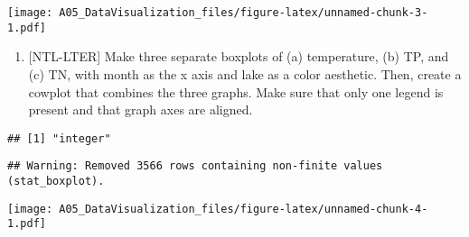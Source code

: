 \documentclass[]{article}
\newenvironment{Shaded}{\begin{snugshade}}{\end{snugshade}}
\newcommand{\DataTypeTok}[1]{\textcolor[rgb]{0.13,0.29,0.53}{#1}}
\newcommand{\KeywordTok}[1]{\textcolor[rgb]{0.13,0.29,0.53}{\textbf{#1}}}
\newcommand{\NormalTok}[1]{#1}
\newcommand{\OperatorTok}[1]{\textcolor[rgb]{0.81,0.36,0.00}{\textbf{#1}}}
\newcommand{\StringTok}[1]{\textcolor[rgb]{0.31,0.60,0.02}{#1}}
\providecommand{\tightlist}{%
  \setlength{\itemsep}{0pt}\setlength{\parskip}{0pt}}
\begin{document}
\texttt{[image: A05\_DataVisualization\_files/figure-latex/unnamed-chunk-3-1.pdf]}

\begin{enumerate}
\def\labelenumi{\arabic{enumi}.}
\setcounter{enumi}{4}
\tightlist
\item
  {[}NTL-LTER{]} Make three separate boxplots of (a) temperature, (b)
  TP, and (c) TN, with month as the x axis and lake as a color
  aesthetic. Then, create a cowplot that combines the three graphs. Make
  sure that only one legend is present and that graph axes are aligned.
\end{enumerate}

\begin{Shaded}
\end{Shaded}

\begin{verbatim}
## [1] "integer"
\end{verbatim}

\begin{Shaded}
\end{Shaded}

\begin{verbatim}
## Warning: Removed 3566 rows containing non-finite values (stat_boxplot).
\end{verbatim}

\texttt{[image: A05\_DataVisualization\_files/figure-latex/unnamed-chunk-4-1.pdf]}
\end{document}
